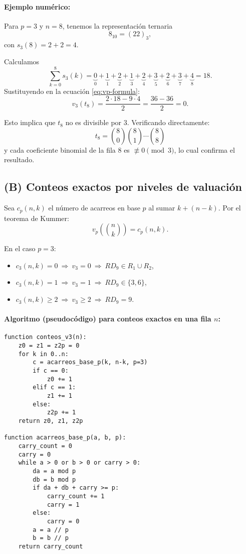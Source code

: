\documentclass[12pt]{article}
\begin{document}
\paragraph{Ejemplo numérico:} Para $p=3$ y $n=8$, tenemos la representación ternaria
\[
8_{10} = (22)_3,
\]
con $s_3(8) = 2+2 = 4$.

Calculamos
\[
\sum_{k=0}^8 s_3(k) =
\underbrace{0}_{0} + 
\underbrace{1}_{1} + 
\underbrace{2}_{2} + 
\underbrace{1}_{3} + 
\underbrace{2}_{4} + 
\underbrace{3}_{5} + 
\underbrace{2}_{6} + 
\underbrace{3}_{7} + 
\underbrace{4}_{8} = 18.
\]
Sustituyendo en la ecuación \eqref{eq:vp-formula}:
\[
v_3(t_8) = \frac{ 2\cdot 18 - 9\cdot 4 }{2} = \frac{36 - 36}{2} = 0.
\]

Esto implica que $t_8$ no es divisible por 3. Verificando directamente:
\[
t_8 = \binom{8}{0}\binom{8}{1}\cdots\binom{8}{8}
\]
y cada coeficiente binomial de la fila 8 es $\not\equiv 0 \pmod{3}$, lo cual confirma el resultado.

\subsection*{(B) Conteos exactos por niveles de valuación}

Sea $c_p(n,k)$ el número de acarreos en base $p$ al sumar $k+(n-k)$.  
Por el teorema de Kummer:
\[
v_p\!\left(\binom{n}{k}\right) = c_p(n,k).
\]

En el caso $p=3$:
\begin{itemize}
    \item $c_3(n,k) = 0 \ \Rightarrow\ v_3=0 \ \Rightarrow\ RD_9 \in R_1 \cup R_2$,
    \item $c_3(n,k) = 1 \ \Rightarrow\ v_3=1 \ \Rightarrow\ RD_9 \in \{3,6\}$,
    \item $c_3(n,k) \ge 2 \ \Rightarrow\ v_3\ge 2 \ \Rightarrow\ RD_9 = 9$.
\end{itemize}

\paragraph{Algoritmo (pseudocódigo) para conteos exactos en una fila $n$:}
\begin{verbatim}
function conteos_v3(n):
    z0 = z1 = z2p = 0
    for k in 0..n:
        c = acarreos_base_p(k, n-k, p=3)
        if c == 0:
            z0 += 1
        elif c == 1:
            z1 += 1
        else:
            z2p += 1
    return z0, z1, z2p

function acarreos_base_p(a, b, p):
    carry_count = 0
    carry = 0
    while a > 0 or b > 0 or carry > 0:
        da = a mod p
        db = b mod p
        if da + db + carry >= p:
            carry_count += 1
            carry = 1
        else:
            carry = 0
        a = a // p
        b = b // p
    return carry_count
\end{verbatim}
\end{document}

